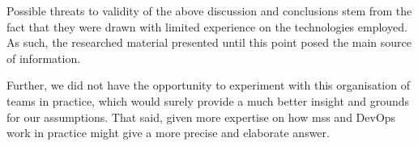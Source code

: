 Possible threats to validity of the above discussion and conclusions
stem from the fact that they were drawn with limited experience on the
technologies employed. As such, the researched material presented until this
point posed the main source of information.

Further, we did not have the
opportunity to experiment with this organisation of teams in practice,
which would surely provide a much better insight and grounds for our
assumptions.  That said, given more expertise on how \glspl{ms} and
DevOps work in practice might give a more precise and elaborate
answer.


